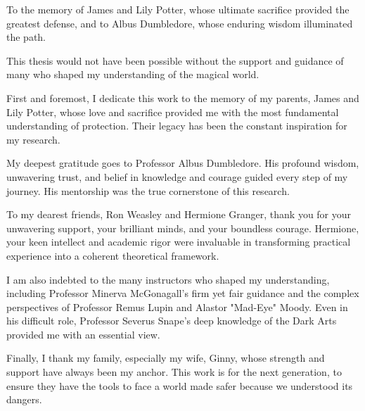 \begin{dedication}
To the memory of James and Lily Potter, whose ultimate sacrifice provided the greatest defense, and to Albus Dumbledore, whose enduring wisdom illuminated the path.
\end{dedication}

\begin{acknowledgements}
This thesis would not have been possible without the support and guidance of many who shaped my understanding of the magical world.

First and foremost, I dedicate this work to the memory of my parents, James and Lily Potter, whose love and sacrifice provided me with the most fundamental understanding of protection. Their legacy has been the constant inspiration for my research.

My deepest gratitude goes to Professor Albus Dumbledore. His profound wisdom, unwavering trust, and belief in knowledge and courage guided every step of my journey. His mentorship was the true cornerstone of this research.

To my dearest friends, Ron Weasley and Hermione Granger, thank you for your unwavering support, your brilliant minds, and your boundless courage. Hermione, your keen intellect and academic rigor were invaluable in transforming practical experience into a coherent theoretical framework.

I am also indebted to the many instructors who shaped my understanding, including Professor Minerva McGonagall’s firm yet fair guidance and the complex perspectives of Professor Remus Lupin and Alastor "Mad-Eye" Moody. Even in his difficult role, Professor Severus Snape’s deep knowledge of the Dark Arts provided me with an essential view.

Finally, I thank my family, especially my wife, Ginny, whose strength and support have always been my anchor. This work is for the next generation, to ensure they have the tools to face a world made safer because we understood its dangers.
\end{acknowledgements}
